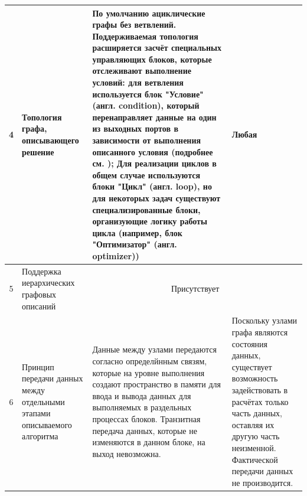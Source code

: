 \begin{landscape}
\begin{longtable}{|c|p{}|p{}|p{}|}
    \hline
    4          & Топология графа, описывающего решение                                                      & По умолчанию ациклические графы без ветвлений. Поддерживаемая топология расширяется засчёт специальных управляющих блоков, которые отслеживают выполнение условий: для ветвления используется блок "Условие" (англ. condition), который перенаправляет данные на один из выходных портов в зависимости от выполнения описанного условия (подробнее см. \cite{pSevenDocsConditons2022}); Для реализации циклов в общем случае используются блоки "Цикл" (англ. loop)\cite{pSevenDocsWorkflow2021}, но для некоторых задач существуют специализированные блоки, организующие логику работы цикла (например, блок "Оптимизатор" (англ. optimizer)) & Любая                                                                                                                                                                                                                                                                             \\
    \hline
    5          & Поддержка иерархических графовых описаний                                                  & \multicolumn{2}{c|}{Присутствует}                                                                                                                                                                                                                                                                                                                                                                                                                                                                                                                                                                                                                                                                                                                                                                                                                                                                                                   \\
    \hline
    6          & Принцип передачи данных между отдельными этапами описываемого алгоритма                    & Данные между узлами передаются согласно определйнным связям, которые на уровне выполнения создают пространство в памяти для ввода и вывода данных для выполняемых в раздельных процессах блоков. Транзитная передача данных, которые не изменяются в данном блоке, на выход невозможна.                                                                                                                                                                                                                                                                                                                                                         & Поскольку узлами графа являются состояния данных, существует возможность задействовать в расчётах только часть данных, оставляя их другую часть неизменной. Фактической передачи данных не производится.                                                                          \\

\end{longtable}
\end{landscape}

